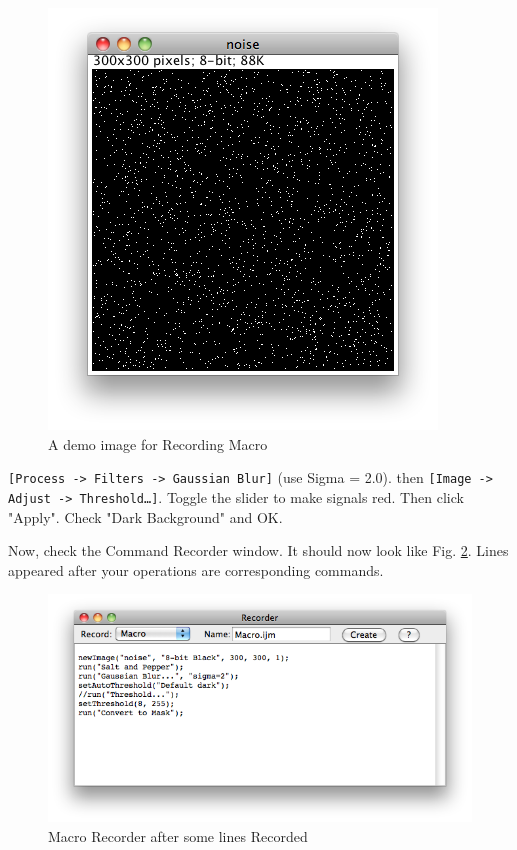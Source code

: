 \documentclass[11pt,a4paper,oneside]{report}
\newcommand{\ijmenu}[1]{\texttt{\small#1}}
\begin{document}
\begin{figure}[htbp]
\begin{center}
\includegraphics[scale=0.6]{fig/SaltandPepper300.png}
\caption{A demo image for Recording Macro} 
\label{fig_SaltAndPepper}
\end{center}
\end{figure}

\ijmenu{[Process -> Filters -> Gaussian Blur]} (use Sigma = 2.0).
then
\ijmenu{[Image -> Adjust -> Threshold\ldots]}. 
Toggle the slider to make signals red. Then click "Apply". Check "Dark Background" and OK. 

Now, check the Command Recorder window. 
It should now look like Fig. \ref{fig_macroRecorderFilled}. 
Lines appeared after your operations are corresponding commands.

\begin{figure}[htbp]
\begin{center}
\includegraphics[scale=0.6]{fig/MacroRecorderFilled.png}
\caption{Macro Recorder after some lines Recorded} 
\label{fig_macroRecorderFilled}
\end{center}
\end{figure}
\end{document}
